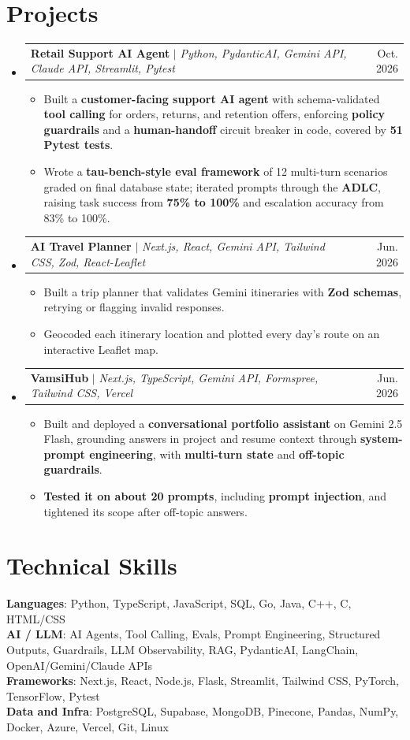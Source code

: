 \documentclass[letterpaper,11pt]{article}
\makeatletter
\newcommand{\resumeItem}[1]{
  \item\small{
    {#1 \vspace{-2pt}}
  }
}
\newcommand{\resumeProjectHeading}[2]{
    \item
    \begin{tabular*}{0.97\textwidth}{l@{\extracolsep{\fill}}r}
      \small#1 & #2 \\
    \end{tabular*}\vspace{-7pt}
}
\newcommand{\resumeSubHeadingListStart}{\begin{itemize}[leftmargin=0.15in, label={}]}
\newcommand{\resumeSubHeadingListEnd}{\end{itemize}}
\newcommand{\resumeItemListStart}{\begin{itemize}}
\newcommand{\resumeItemListEnd}{\end{itemize}\vspace{-5pt}}
\makeatother
\begin{document}
\section{Projects}
    \resumeSubHeadingListStart
      \resumeProjectHeading
          {\textbf{Retail Support AI Agent} $|$ \emph{Python, PydanticAI, Gemini API, Claude API, Streamlit, Pytest}}{Oct. 2026}
          \resumeItemListStart
            \resumeItem{Built a \textbf{customer-facing support AI agent} with schema-validated \textbf{tool calling} for orders, returns, and retention offers, enforcing \textbf{policy guardrails} and a \textbf{human-handoff} circuit breaker in code, covered by \textbf{51 Pytest tests}.}
            \resumeItem{Wrote a \textbf{tau-bench-style eval framework} of 12 multi-turn scenarios graded on final database state; iterated prompts through the \textbf{ADLC}, raising task success from \textbf{75\% to 100\%} and escalation accuracy from 83\% to 100\%.}
          \resumeItemListEnd
      \resumeProjectHeading
          {\textbf{AI Travel Planner} $|$ \emph{Next.js, React, Gemini API, Tailwind CSS, Zod, React-Leaflet}}{Jun. 2026}
          \resumeItemListStart
            \resumeItem{Built a trip planner that validates Gemini itineraries with \textbf{Zod schemas}, retrying or flagging invalid responses.}
            \resumeItem{Geocoded each itinerary location and plotted every day's route on an interactive Leaflet map.}
          \resumeItemListEnd
      \resumeProjectHeading
          {\textbf{VamsiHub} $|$ \emph{Next.js, TypeScript, Gemini API, Formspree, Tailwind CSS, Vercel}}{Jun. 2026}
          \resumeItemListStart
            \resumeItem{Built and deployed a \textbf{conversational portfolio assistant} on Gemini 2.5 Flash, grounding answers in project and resume context through \textbf{system-prompt engineering}, with \textbf{multi-turn state} and \textbf{off-topic guardrails}.}
            \resumeItem{\textbf{Tested it on about 20 prompts}, including \textbf{prompt injection}, and tightened its scope after off-topic answers.}
          \resumeItemListEnd


    \resumeSubHeadingListEnd

%
\section{Technical Skills}
 \begin{itemize}[leftmargin=0.15in, label={}]
    \small{\item{
     \textbf{Languages}{: Python, TypeScript, JavaScript, SQL, Go, Java, C++, C, HTML/CSS} \\
\textbf{AI / LLM}{: AI Agents, Tool Calling, Evals, Prompt Engineering, Structured Outputs, Guardrails, LLM Observability, RAG, PydanticAI, LangChain, OpenAI/Gemini/Claude APIs} \\
\textbf{Frameworks}{: Next.js, React, Node.js, Flask, Streamlit, Tailwind CSS, PyTorch, TensorFlow, Pytest} \\
\textbf{Data and Infra}{: PostgreSQL, Supabase, MongoDB, Pinecone, Pandas, NumPy, Docker, Azure, Vercel, Git, Linux}
    }}
 \end{itemize}
\end{document}
